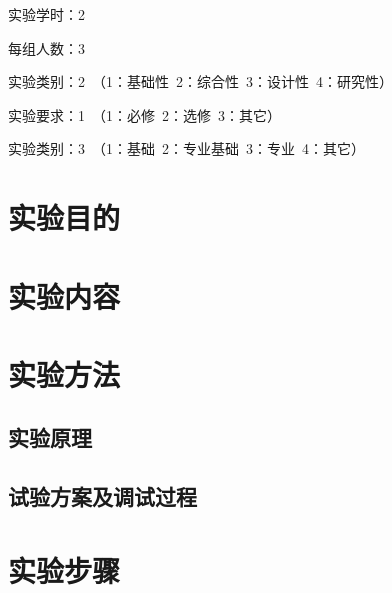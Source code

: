 ﻿\documentclass[UTF8,12pt]{article}
\newcommand\myemptypage{
    \null
    \thispagestyle{empty}
    \addtocounter{page}{-1}
    \newpage
}
\begin{document}
\begin{titlepage}
    
\end{titlepage}

\myemptypage

\begin{center}
    \tableofcontents
\end{center}

\newpage


实验学时：2

每组人数：3

实验类别：2\ （1：基础性\ 2：综合性\ 3：设计性\ 4：研究性）

实验要求：1\ （1：必修\ 2：选修\ 3：其它）

实验类别：3\ （1：基础\ 2：专业基础\ 3：专业\ 4：其它）

\section{实验目的}


\section{实验内容}


\section{实验方法}
\subsection{实验原理}


\subsection{试验方案及调试过程}


\section{实验步骤}
\end{document}
